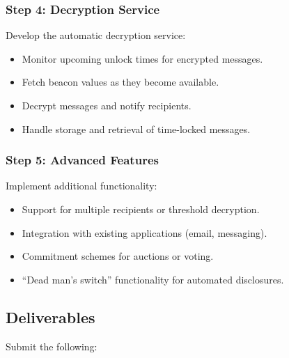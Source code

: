 \documentclass[10pt,a4paper,american]{exam}
\begin{document}
\subsubsection*{Step 4: Decryption Service}
Develop the automatic decryption service:
\begin{itemize}
	\item Monitor upcoming unlock times for encrypted messages.
	\item Fetch beacon values as they become available.
	\item Decrypt messages and notify recipients.
	\item Handle storage and retrieval of time-locked messages.
\end{itemize}

\subsubsection*{Step 5: Advanced Features}
Implement additional functionality:
\begin{itemize}
	\item Support for multiple recipients or threshold decryption.
	\item Integration with existing applications (email, messaging).
	\item Commitment schemes for auctions or voting.
	\item ``Dead man's switch'' functionality for automated disclosures.
\end{itemize}

\subsection*{Deliverables}
Submit the following:
\end{document}

